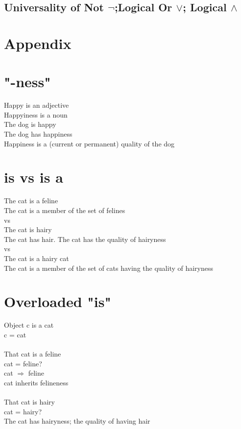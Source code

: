 \documentclass[11pt]{article}
\begin{document}
\subsection{Universality of Not $\lnot$;\hspace{2mm}Logical Or $\lor$;\hspace{2mm} Logical $\land$}




















\newpage
\section*{Appendix}

\section{"-ness"}
Happy is an adjective\\
Happyiness is a noun\\
The dog is happy\\
The dog has happiness\\
Happiness is a (current or permanent) quality of the dog

\section{is vs is a}
The cat is a feline\\
The cat is a member of the set of felines\\
vs\\
The cat is hairy\\
The cat has hair. The cat has the quality of hairyness\\
vs\\
The cat is a hairy cat\\
The cat is a member of the set of cats having the quality of hairyness\\


\section{Overloaded "is"}
Object c is a cat\\
c = cat\\
\\
That cat is a feline\\
cat = feline?\\
cat $\Rightarrow$ feline\\
cat inherits felineness\\
\\
That cat is hairy\\
cat = hairy?\\
The cat has hairyness; the quality of having hair
\end{document}
